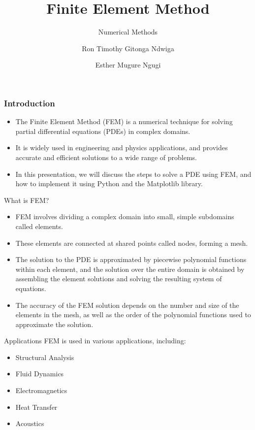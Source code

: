 \documentclass{beamer}
\title{Finite Element Method}
\subtitle{Numerical Methods}
\author{
Ron Timothy Gitonga Ndwiga 
\and 
Esther  Mugure Ngugi
}
\begin{document}
\frame{\titlepage}

\begin{frame}
\frametitle{Introduction}
\begin{itemize}
      \item The Finite Element Method (FEM) is a numerical technique for solving partial differential equations (PDEs) in complex domains.
      \item It is widely used in engineering and physics applications, and provides accurate and efficient solutions to a wide range of problems.
      \item In this presentation, we will discuss the steps to solve a PDE using FEM, and how to implement it using Python and the Matplotlib library.
  \end{itemize}
\end{frame}
\begin{frame}{What is FEM?}
  \begin{itemize}
      \item FEM involves dividing a complex domain into small, simple subdomains called elements.
      \item These elements are connected at shared points called nodes, forming a mesh.
      \item The solution to the PDE is approximated by piecewise polynomial functions within each element, and the solution over the entire domain is obtained by assembling the element solutions and solving the resulting system of equations.
      \item The accuracy of the FEM solution depends on the number and size of the elements in the mesh, as well as the order of the polynomial functions used to approximate the solution.
  \end{itemize}
\end{frame}
\begin{frame}{Applications}
  FEM is used in various applications, including:
  \begin{itemize}
      \item Structural Analysis
      \item Fluid Dynamics
      \item Electromagnetics
      \item Heat Transfer
      \item Acoustics
  \end{itemize}
\end{frame}
\end{document}
